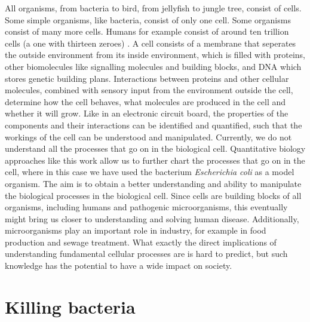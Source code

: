 All organisms, from bacteria to bird, from jellyfish to jungle tree, consist of cells. 
%
Some simple organisms, like bacteria, consist of only one cell.
Some organisms consist of many more cells.
Humans for example consist of around ten trillion cells (a one with thirteen zeroes) \cite[BNID 102390]{Milo2010}.
%
A cell consists of a membrane that %
seperates the outside environment from its inside environment, 
which is filled with proteins, other biomolecules like signalling molecules and building blocks, and DNA which stores genetic building plans.
%
Interactions between proteins and other cellular molecules, combined with sensory input from the environment outside the cell, 
determine how the cell behaves, what molecules are produced in the cell and whether it will grow.
%
Like 
in an electronic circuit board,
the properties of the components and their interactions can be identified and quantified,
such that the workings of the cell can be understood and manipulated.
%
Currently, we do not understand all the processes that go on in the biological cell.
%
Quantitative biology approaches like this work allow us to further chart the processes that go on in the cell,
where in this case we have used the bacterium \textit{Escherichia coli} as a model organism. 
%
The aim is to obtain a better understanding and ability to manipulate the biological processes in the biological cell. 
%
Since cells are building blocks of all organisms, 
including humans and pathogenic microorganisms,
this eventually might bring us closer to understanding and solving human disease.
%
Additionally, microorganisms play an important role in industry,
for example in food production and sewage treatment.
%
What exactly the direct implications of understanding fundamental cellular processes are is hard to predict,
but such knowledge has the potential to have a wide impact on society.

\section{Killing bacteria}

